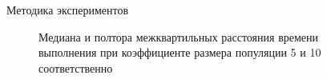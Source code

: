 \documentclass{beamer}
\begin{document}
\begin{frame}{Методика экспериментов}
    \begin{figure}
        \caption{Медиана и полтора межквартильных расстояния
            времени выполнения при коэффициенте размера популяции
            5 и 10 соответственно}
    \end{figure}
\end{frame}
\end{document}
